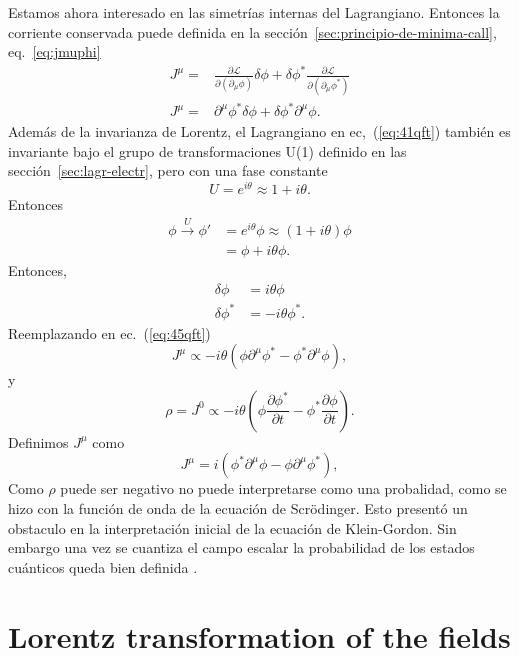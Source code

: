 Estamos ahora interesado en las simetrías internas del Lagrangiano. Entonces la corriente conservada puede definida en la sección~\ref{sec:principio-de-minima-call}, eq.~\eqref{eq:jmuphi}
\begin{align}
  J^\mu=&\frac{\partial\mathcal{L}}{\partial(\partial_\mu\phi)}\delta\phi+\delta\phi^*\frac{\partial\mathcal{L}}{\partial(\partial_\mu\phi^*)}\nonumber\\
  \label{eq:45qft}
  J^\mu=&\partial^\mu\phi^*\delta\phi+\delta\phi^*\partial^\mu\phi.
\end{align}
Además de la invarianza de Lorentz, el Lagrangiano en ec,~(\ref{eq:41qft}) también es invariante bajo el grupo de transformaciones U(1) definido en las sección~\ref{sec:lagr-electr}, pero con una fase constante
\begin{equation*}
  U=e^{i\theta}\approx1+i\theta.
\end{equation*}
Entonces
\begin{align}
  \phi\overset{U}{\longrightarrow}\phi'&=e^{i\theta}\phi\approx(1+i\theta)\phi\nonumber\\
  &=\phi+i\theta\phi.
\end{align}
Entonces,
\begin{align}
  \delta\phi&=i\theta\phi\\
  \delta\phi^*&=-i\theta\phi^*.
\end{align}
Reemplazando en ec.~(\ref{eq:45qft})
\begin{equation}
\label{eq:46qft}
  J^\mu\propto -i\theta(\phi\partial^\mu\phi^*-\phi^*\partial^\mu\phi),
\end{equation}
y
\begin{equation}
\label{eq:47qft}
  \rho=J^0\propto-i\theta(\phi\frac{\partial\phi^*}{\partial t}-\phi^*\frac{\partial\phi}{\partial t}).
\end{equation}
Definimos $J^\mu$ como
\begin{equation}
  \label{eq:48qft}
   J^\mu= i(\phi^*\partial^\mu\phi-\phi\partial^\mu\phi^*),
\end{equation}
Como $\rho$ puede ser negativo no puede interpretarse como una
probalidad, como se hizo con la función de onda de la ecuación de
Scrödinger. Esto presentó un obstaculo en la interpretación inicial de
la ecuación de Klein-Gordon. Sin embargo una vez se cuantiza el
campo escalar la probabilidad de los estados cuánticos queda bien
definida \cite{Gross}. 


\section{Lorentz transformation of the fields}

